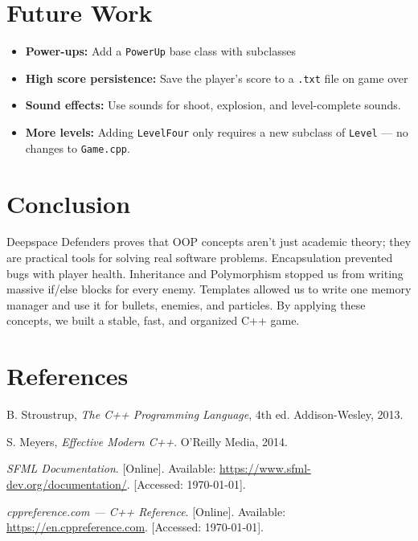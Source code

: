 \documentclass[11pt]{article}
\begin{document}
\section{Future Work}

\begin{itemize}
    \item \textbf{Power-ups:} Add a \texttt{PowerUp} base class with subclasses
    \item \textbf{High score persistence:} Save the player's score to a
          \texttt{.txt} file on game over
    \item \textbf{Sound effects:} Use sounds for shoot, explosion, and level-complete sounds.
    \item \textbf{More levels:} Adding \texttt{LevelFour} only requires a new
          subclass of \texttt{Level} --- no changes to \texttt{Game.cpp}.
\end{itemize}

\clearpage
\section{Conclusion}

\begin{infobox}
Deepspace Defenders proves that OOP concepts aren't just academic theory; they are practical tools for solving real software problems. Encapsulation prevented bugs with player health. Inheritance and Polymorphism stopped us from writing massive if/else blocks for every enemy. Templates allowed us to write one memory manager and use it for bullets, enemies, and particles. By applying these concepts, we built a stable, fast, and organized C++ game.
\end{infobox}

\newpage
\section*{References}

\begin{enumerate}[label={[\arabic*]}]
    \item B. Stroustrup, \textit{The C++ Programming Language}, 4th ed. Addison-Wesley, 2013.
    \item S. Meyers, \textit{Effective Modern C++}. O'Reilly Media, 2014.
    \item \textit{SFML Documentation}. [Online]. Available: \url{https://www.sfml-dev.org/documentation/}. [Accessed: \today].
    \item \textit{cppreference.com --- C++ Reference}. [Online]. Available: \url{https://en.cppreference.com}. [Accessed: \today].

\end{enumerate}
\end{document}
